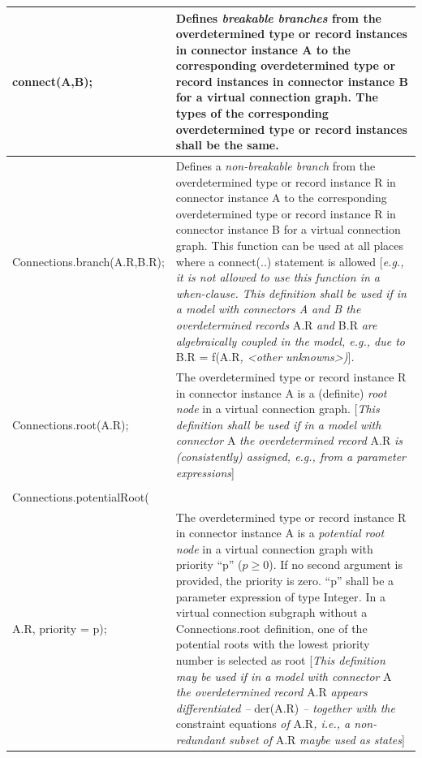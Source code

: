 \documentclass[10pt,a4paper]{report}
\begin{document}
\begin{longtable}[]{|p{5.1cm}|p{10cm}|}
\hline \endhead
connect(A,B); & Defines \emph{breakable branches} from the
overdetermined type or record instances in connector instance A to the
corresponding overdetermined type or record instances in connector
instance B for a virtual connection graph. The types of the
corresponding overdetermined type or record instances shall be the
same.\\ \hline
Connections.branch(A.R,B.R); & Defines a \emph{non-breakable branch}
from the overdetermined type or record instance R in connector instance
A to the corresponding overdetermined type or record instance R in
connector instance B for a virtual connection graph. This function can
be used at all places where a connect(..) statement is allowed
{[}\emph{e.g., it is not allowed to use this function in a when-clause.
This definition shall be used if in a model with connectors A and B the
overdetermined records} A.R \emph{and} B.R \emph{are algebraically
coupled in the model, e.g., due to} B.R = f(A.R\emph{, \textless{}other
unknowns\textgreater{})}{]}\emph{.}\\ \hline
Connections.root(A.R); & The overdetermined type or record instance R in
connector instance A is a (definite) \emph{root node} in a virtual
connection graph. {[}\emph{This definition shall be used if in a model
with connector} A \emph{the overdetermined record} A.R \emph{is
(consistently) assigned, e.g., from a parameter
expressions}{]}\\ \hline
\begin{tabular}{@{}p{5.1cm}@{}}
Connections.potentialRoot(A.R);\\
Connections.potentialRoot(\\
A.R, priority = p);
\end{tabular}
& The overdetermined type or record instance R in connector instance A is
a \emph{potential root node} in a virtual connection graph with priority
``p'' ($p\ge 0$). If no second argument is provided, the priority is zero.
``p'' shall be a parameter expression of type Integer\emph{.} In a
virtual connection subgraph without a Connections.root definition, one
of the potential roots with the lowest priority number is selected as
root {[}\emph{This definition may be used if in a model with connector}
A \emph{the overdetermined record} A.R \emph{appears differentiated --}
der(A.R) \emph{-- together with the} constraint equations \emph{of}
A.R\emph{, i.e., a non-redundant subset of} A.R \emph{maybe used as
states}{]}

\end{longtable}
\end{document}
